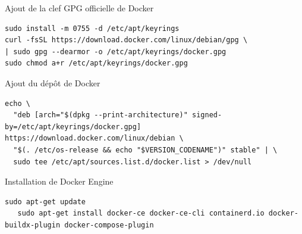 
\begin{frame}[fragile]{Ajout de la clef GPG officielle de Docker}

\begin{tiny}
\begin{Verbatim}[commandchars=\&\#\#]
sudo install -m 0755 -d /etc/apt/keyrings
curl -fsSL https://download.docker.com/linux/debian/gpg \
| sudo gpg --dearmor -o /etc/apt/keyrings/docker.gpg
sudo chmod a+r /etc/apt/keyrings/docker.gpg
\end{Verbatim}
\end{tiny}

\end{frame}


\begin{frame}[shrink=7,fragile]{Ajout du dépôt de Docker}

\begin{tiny}
\begin{Verbatim}[commandchars=\&\#\#]
  echo \
  "deb [arch="$(dpkg --print-architecture)" signed-by=/etc/apt/keyrings/docker.gpg] https://download.docker.com/linux/debian \
  "$(. /etc/os-release && echo "$VERSION_CODENAME")" stable" | \
  sudo tee /etc/apt/sources.list.d/docker.list > /dev/null
\end{Verbatim}
\end{tiny}

\end{frame}


\begin{frame}[fragile]{Installation de Docker Engine}

\begin{tiny}
\begin{Verbatim}[commandchars=\&\#\#]
   sudo apt-get update
   sudo apt-get install docker-ce docker-ce-cli containerd.io docker-buildx-plugin docker-compose-plugin
\end{Verbatim}
\end{tiny}

\end{frame}


